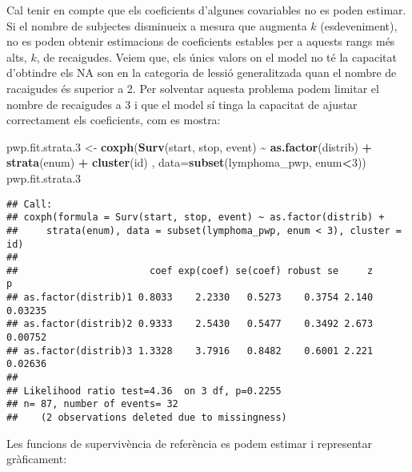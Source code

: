 \documentclass[
]{article}
\newenvironment{Shaded}{\begin{snugshade}}{\end{snugshade}}
\newcommand{\AttributeTok}[1]{\textcolor[rgb]{0.13,0.29,0.53}{#1}}
\newcommand{\DecValTok}[1]{\textcolor[rgb]{0.00,0.00,0.81}{#1}}
\newcommand{\FloatTok}[1]{\textcolor[rgb]{0.00,0.00,0.81}{#1}}
\newcommand{\FunctionTok}[1]{\textcolor[rgb]{0.13,0.29,0.53}{\textbf{#1}}}
\newcommand{\NormalTok}[1]{#1}
\newcommand{\OtherTok}[1]{\textcolor[rgb]{0.56,0.35,0.01}{#1}}
\newcommand{\SpecialCharTok}[1]{\textcolor[rgb]{0.81,0.36,0.00}{\textbf{#1}}}
\begin{document}
Cal tenir en compte que els coeficients d'algunes covariables no es
poden estimar. Si el nombre de subjectes disminueix a mesura que
augmenta \(k\) (esdeveniment), no es poden obtenir estimacions de
coeficients estables per a aquests rangs més alts, \(k\), de recaigudes.
Veiem que, els únics valors on el model no té la capacitat d'obtindre
els NA son en la categoria de lessió generalitzada quan el nombre de
racaigudes és superior a 2. Per solventar aquesta problema podem limitar
el nombre de recaigudes a 3 i que el model sí tinga la capacitat de
ajustar correctament els coeficients, com es mostra:

\begin{Shaded}
\begin{Highlighting}[]
\NormalTok{pwp.fit.strata}\FloatTok{.3} \OtherTok{\textless{}{-}} \FunctionTok{coxph}\NormalTok{(}\FunctionTok{Surv}\NormalTok{(start, stop, event) }\SpecialCharTok{\textasciitilde{}} \FunctionTok{as.factor}\NormalTok{(distrib) }\SpecialCharTok{+} \FunctionTok{strata}\NormalTok{(enum) }\SpecialCharTok{+}
                  \FunctionTok{cluster}\NormalTok{(id) , }\AttributeTok{data=}\FunctionTok{subset}\NormalTok{(lymphoma\_pwp, enum}\SpecialCharTok{\textless{}}\DecValTok{3}\NormalTok{))}
\NormalTok{pwp.fit.strata}\FloatTok{.3}
\end{Highlighting}
\end{Shaded}

\begin{verbatim}
## Call:
## coxph(formula = Surv(start, stop, event) ~ as.factor(distrib) + 
##     strata(enum), data = subset(lymphoma_pwp, enum < 3), cluster = id)
## 
##                       coef exp(coef) se(coef) robust se     z       p
## as.factor(distrib)1 0.8033    2.2330   0.5273    0.3754 2.140 0.03235
## as.factor(distrib)2 0.9333    2.5430   0.5477    0.3492 2.673 0.00752
## as.factor(distrib)3 1.3328    3.7916   0.8482    0.6001 2.221 0.02636
## 
## Likelihood ratio test=4.36  on 3 df, p=0.2255
## n= 87, number of events= 32 
##    (2 observations deleted due to missingness)
\end{verbatim}

Les funcions de supervivència de referència es podem estimar i
representar gràficament:
\end{document}
